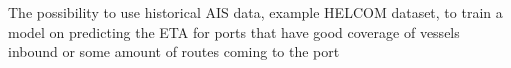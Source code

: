 \documentclass[../main.tex]{subfiles}
\begin{document}
The possibility to use historical AIS data, example HELCOM dataset, to train a model on predicting the ETA for ports that have good coverage of vessels inbound or some amount of routes coming to the port
\end{document}
